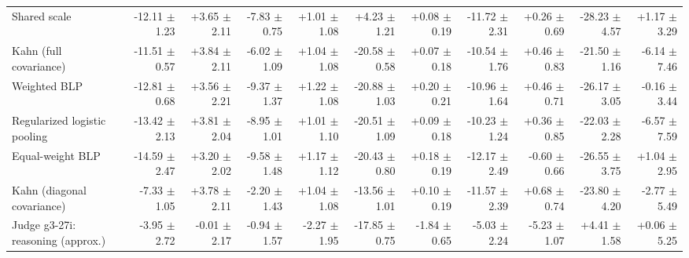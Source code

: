 \begin{tabular}{lrrrrrrrrrr}
Shared scale & -12.11 {\scriptsize $\pm$ 1.23} & +3.65 {\scriptsize $\pm$ 2.11} & -7.83 {\scriptsize $\pm$ 0.75} & +1.01 {\scriptsize $\pm$ 1.08} & +4.23 {\scriptsize $\pm$ 1.21} & +0.08 {\scriptsize $\pm$ 0.19} & -11.72 {\scriptsize $\pm$ 2.31} & +0.26 {\scriptsize $\pm$ 0.69} & -28.23 {\scriptsize $\pm$ 4.57} & +1.17 {\scriptsize $\pm$ 3.29} \\
Kahn (full covariance) & -11.51 {\scriptsize $\pm$ 0.57} & +3.84 {\scriptsize $\pm$ 2.11} & -6.02 {\scriptsize $\pm$ 1.09} & +1.04 {\scriptsize $\pm$ 1.08} & -20.58 {\scriptsize $\pm$ 0.58} & +0.07 {\scriptsize $\pm$ 0.18} & -10.54 {\scriptsize $\pm$ 1.76} & +0.46 {\scriptsize $\pm$ 0.83} & -21.50 {\scriptsize $\pm$ 1.16} & -6.14 {\scriptsize $\pm$ 7.46} \\
Weighted BLP & -12.81 {\scriptsize $\pm$ 0.68} & +3.56 {\scriptsize $\pm$ 2.21} & -9.37 {\scriptsize $\pm$ 1.37} & +1.22 {\scriptsize $\pm$ 1.08} & -20.88 {\scriptsize $\pm$ 1.03} & +0.20 {\scriptsize $\pm$ 0.21} & -10.96 {\scriptsize $\pm$ 1.64} & +0.46 {\scriptsize $\pm$ 0.71} & -26.17 {\scriptsize $\pm$ 3.05} & -0.16 {\scriptsize $\pm$ 3.44} \\
Regularized logistic pooling & -13.42 {\scriptsize $\pm$ 2.13} & +3.81 {\scriptsize $\pm$ 2.04} & -8.95 {\scriptsize $\pm$ 1.01} & +1.01 {\scriptsize $\pm$ 1.10} & -20.51 {\scriptsize $\pm$ 1.09} & +0.09 {\scriptsize $\pm$ 0.18} & -10.23 {\scriptsize $\pm$ 1.24} & +0.36 {\scriptsize $\pm$ 0.85} & -22.03 {\scriptsize $\pm$ 2.28} & -6.57 {\scriptsize $\pm$ 7.59} \\
Equal-weight BLP & -14.59 {\scriptsize $\pm$ 2.47} & +3.20 {\scriptsize $\pm$ 2.02} & -9.58 {\scriptsize $\pm$ 1.48} & +1.17 {\scriptsize $\pm$ 1.12} & -20.43 {\scriptsize $\pm$ 0.80} & +0.18 {\scriptsize $\pm$ 0.19} & -12.17 {\scriptsize $\pm$ 2.49} & -0.60 {\scriptsize $\pm$ 0.66} & -26.55 {\scriptsize $\pm$ 3.75} & +1.04 {\scriptsize $\pm$ 2.95} \\
Kahn (diagonal covariance) & -7.33 {\scriptsize $\pm$ 1.05} & +3.78 {\scriptsize $\pm$ 2.11} & -2.20 {\scriptsize $\pm$ 1.43} & +1.04 {\scriptsize $\pm$ 1.08} & -13.56 {\scriptsize $\pm$ 1.01} & +0.10 {\scriptsize $\pm$ 0.19} & -11.57 {\scriptsize $\pm$ 2.39} & +0.68 {\scriptsize $\pm$ 0.74} & -23.80 {\scriptsize $\pm$ 4.20} & -2.77 {\scriptsize $\pm$ 5.49} \\
Judge g3-27i: reasoning (approx.) & -3.95 {\scriptsize $\pm$ 2.72} & -0.01 {\scriptsize $\pm$ 2.17} & -0.94 {\scriptsize $\pm$ 1.57} & -2.27 {\scriptsize $\pm$ 1.95} & -17.85 {\scriptsize $\pm$ 0.75} & -1.84 {\scriptsize $\pm$ 0.65} & -5.03 {\scriptsize $\pm$ 2.24} & -5.23 {\scriptsize $\pm$ 1.07} & +4.41 {\scriptsize $\pm$ 1.58} & +0.06 {\scriptsize $\pm$ 5.25} \\

\end{tabular}
